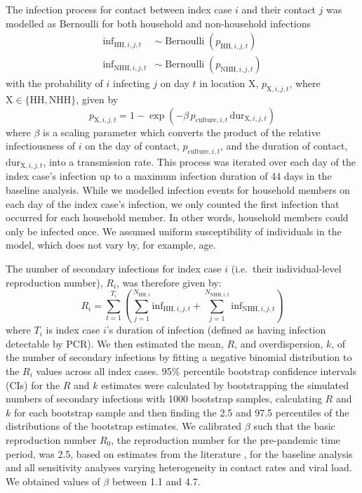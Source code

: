 \documentclass[
  10pt,
  letterpaper,
]{article}
\begin{document}
The infection process for contact between index case \(i\) and their
contact \(j\) was modelled as Bernoulli for both household and
non-household infections \[
\begin{aligned}
\mathrm{inf}_{\mathrm{HH},i,j,t} &\sim \operatorname{Bernoulli}(p_{\mathrm{HH},i,j,t}) \\
\mathrm{inf}_{\mathrm{NHH},i,j,t} &\sim \operatorname{Bernoulli}(p_{\mathrm{NHH},i,j,t})
\end{aligned}
\] with the probability of \(i\) infecting \(j\) on day \(t\) in
location \(\mathrm{X}\), \(p_{\mathrm{X},i,j,t}\), where
\(\mathrm{X} \in \{\mathrm{HH}, \mathrm{NHH}\}\), given by \[
p_{\mathrm{X},i,j,t} = 1 - \exp\left(-\beta\, p_{\mathrm{culture},i,t}\, \mathrm{dur}_{\mathrm{X},i,j,t}\right)
\] where \(\beta\) is a scaling parameter which converts the product of
the relative infectiousness of \(i\) on the day of contact,
\(p_{\mathrm{culture},i,t}\), and the duration of contact,
\(\mathrm{dur}_{\mathrm{X},i,j,t}\), into a transmission rate. This
process was iterated over each day of the index case's infection up to a
maximum infection duration of 44 days in the baseline analysis. While we
modelled infection events for household members on each day of the index
case's infection, we only counted the first infection that occurred for
each household member. In other words, household members could only be
infected once. We assumed uniform susceptibility of individuals in the
model, which does not vary by, for example, age.

The number of secondary infections for index case \(i\) (i.e.~their
individual-level reproduction number), \(R_i\), was therefore given by:
\[
R_i = \sum_{t=1}^{T_i} \left(\sum_{j=1}^{N_{\mathrm{HH},i}} \mathrm{inf}_{\mathrm{HH},i,j,t} + \sum_{j=1}^{N_{\mathrm{NHH},i,t}} \mathrm{inf}_{\mathrm{NHH},i,j,t}\right)
\] where \(T_i\) is index case \(i\)'s duration of infection (defined as
having infection detectable by PCR). We then estimated the mean, \(R\),
and overdispersion, \(k\), of the number of secondary infections by
fitting a negative binomial distribution to the \(R_i\) values across
all index cases. 95\% percentile bootstrap confidence intervals (CIs)
for the \(R\) and \(k\) estimates were calculated by bootstrapping the
simulated numbers of secondary infections with 1000 bootstrap samples,
calculating \(R\) and \(k\) for each bootstrap sample and then finding
the 2.5 and 97.5 percentiles of the distributions of the bootstrap
estimates. We calibrated \(\beta\) such that the basic reproduction
number \(R_0\), the reproduction number for the pre-pandemic time
period, was 2.5, based on estimates from the literature
\citep{jarvis2020, davies2020, spimrtuk}, for the baseline analysis and
all sensitivity analyses varying heterogeneity in contact rates and
viral load. We obtained values of \(\beta\) between 1.1 and 4.7.
\end{document}
